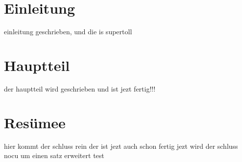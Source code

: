 \documentclass[11pt,a4paper]{article}
\begin{document}
\section{Einleitung}

einleitung geschrieben, und die is supertoll

\section{Hauptteil}

der hauptteil wird geschrieben und ist jezt fertig!!!

\section{Resümee}

hier kommt der schluss rein der ist jezt auch schon fertig
jezt wird der schluss nocu um einen satz erweitert
test
\end{document}
